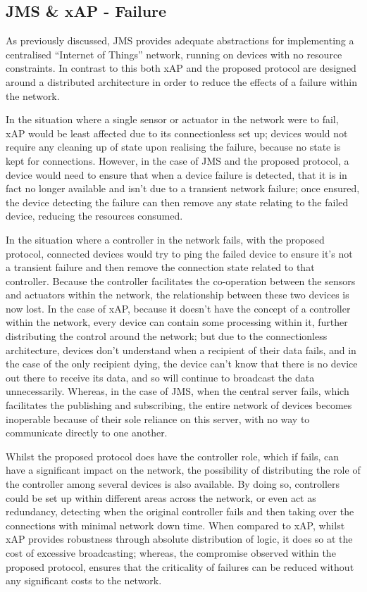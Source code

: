 \subsection{JMS \& xAP - Failure} %
\label{sub:jms_failure}
As previously discussed, JMS provides adequate abstractions for implementing a centralised ``Internet of Things'' network, running on devices with no resource constraints. In contrast to this both xAP and the proposed protocol are designed around a distributed architecture in order to reduce the effects of a failure within the network.

In the situation where a single sensor or actuator in the network were to fail, xAP would be least affected due to its connectionless set up; devices would not require any cleaning up of state upon realising the failure, because no state is kept for connections. However, in the case of JMS and the proposed protocol, a device would need to ensure that when a device failure is detected, that it is in fact no longer available and isn't due to a transient network failure; once ensured, the device detecting the failure can then remove any state relating to the failed device, reducing the resources consumed.

In the situation where a controller in the network fails, with the proposed protocol, connected devices would try to ping the failed device to ensure it's not a transient failure and then remove the connection state related to that controller. Because the controller facilitates the co-operation between the sensors and actuators within the network, the relationship between these two devices is now lost. In the case of xAP, because it doesn't have the concept of a controller within the network, every device can contain some processing within it, further distributing the control around the network; but due to the connectionless architecture, devices don't understand when a recipient of their data fails, and in the case of the only recipient dying, the device can't know that there is no device out there to receive its data, and so will continue to broadcast the data unnecessarily. Whereas, in the case of JMS, when the central server fails, which facilitates the publishing and subscribing, the entire network of devices becomes inoperable because of their sole reliance on this server, with no way to communicate directly to one another.

Whilst the proposed protocol does have the controller role, which if fails, can have a significant impact on the network, the possibility of distributing the role of the controller among several devices is also available. By doing so, controllers could be set up within different areas across the network, or even act as redundancy, detecting when the original controller fails and then taking over the connections with minimal network down time. When compared to xAP, whilst xAP provides robustness through absolute distribution of logic, it does so at the cost of excessive broadcasting; whereas, the compromise observed within the proposed protocol, ensures that the criticality of failures can be reduced without any significant costs to the network. 



